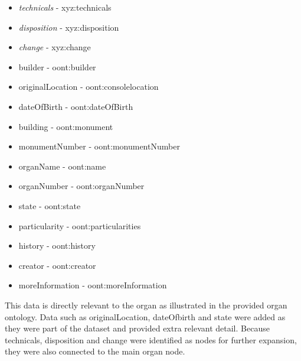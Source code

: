 \vspace{-0.15cm}
\begin{itemize}
    \itemsep0em 
    \item \textit{technicals} - xyz:technicals
    \vspace{-0.1cm}
    \item \textit{disposition} - xyz:disposition
    \vspace{-0.1cm}
    \item \textit{change} - xyz:change
    \vspace{-0.1cm}
    \item builder - oont:builder
    \vspace{-0.1cm}
    \item originalLocation - oont:consolelocation
    \vspace{-0.1cm}
    \item dateOfBirth - oont:dateOfBirth
    \vspace{-0.1cm}
    \item building - oont:monument
    \vspace{-0.1cm}
    \item monumentNumber - oont:monumentNumber
    \vspace{-0.1cm}
    \item organName - oont:name
    \vspace{-0.1cm}
    \item organNumber - oont:organNumber 
    \vspace{-0.1cm}
    \item state - oont:state 
    \vspace{-0.1cm}
    \item particularity - oont:particularities
    \vspace{-0.1cm}
    \item history - oont:history
    \vspace{-0.1cm}
    \item creator - oont:creator
    \vspace{-0.1cm}
    \item moreInformation - oont:moreInformation 
\end{itemize}

This data is directly relevant to the organ as illustrated in the provided organ ontology. Data such as originalLocation, dateOfbirth and state were added as they were part of the dataset and provided extra relevant detail. Because technicals, disposition and change were identified as nodes for further expansion, they were also connected to the main organ node. 

